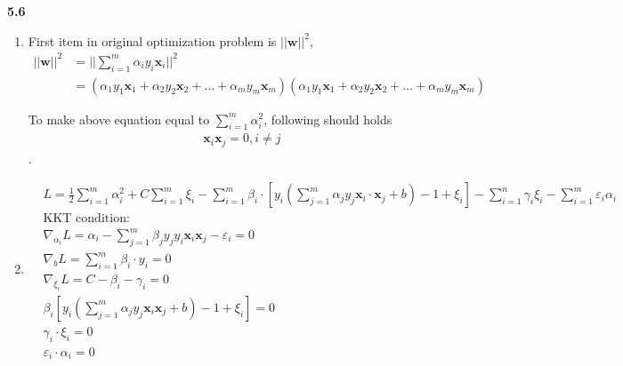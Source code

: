 \documentclass[12pt]{article}
\begin{document}
\vspace{1em}  %

\noindent \textbf{5.6}

\begin{enumerate}[label=(\alph*), left=0pt]
    \item First item in original optimization problem is $||\mathbf{w}||^{2}$, 
        \begin{align*}
            ||\mathbf{w}||^{2} &= ||\sum_{i=1}^{m}\alpha_{i}y_{i}\mathbf{x}_{i}||^{2} \\
            &= (\alpha_{1}y_{1}\mathbf{x}_{1}+\alpha_{2}y_{2}\mathbf{x}_{2}+\dots+\alpha_{m}y_{m}\mathbf{x}_{m})(\alpha_{1}y_{1}\mathbf{x}_{1}+\alpha_{2}y_{2}\mathbf{x}_{2}+\dots+\alpha_{m}y_{m}\mathbf{x}_{m})
        \end{align*}
        
        To make above equation equal to $\sum_{i=1}^{m}\alpha_{i}^{2}$, following should holds 
        \begin{align*}
            \mathbf{x}_{i}\mathbf{x}_{j} = 0, i \ne j
        \end{align*}.

    \item 
    \begin{align*}
        &L=\frac{1}{2}\sum_{i=1}^{m}\alpha_{i}^{2}+C\sum_{i=1}^{m}\xi_{i}-\sum_{i=1}^{m}\beta_{i}\cdot[y_{i}(\sum_{j=1}^{m}\alpha_{j}y_{j}\textbf{x}_{i}\cdot \textbf{x}_{j}+b)-1+\xi_{i}]-\sum_{i=1}^{n}\gamma_{i}\xi_{i}-\sum_{i=1}^{m}\varepsilon_{i}\alpha_{i} \\
        &\text{KKT condition:} \\
        & \nabla_{\alpha_{i}}L=\alpha_{i} - \sum_{j=1}^{m}\beta_{j}y_{j}y_{i}\textbf{x}_{i}\textbf{x}_{j}-\varepsilon_{i}=0 \\
        &\nabla_{b}L=\sum_{i=1}^{m}\beta_{i}\cdot y_{i}=0 \\
        &\nabla_{\xi_{i}}L=C-\beta_{i}-\gamma_{i}=0 \\
        &\beta_{i}[y_{i}(\sum_{j=1}^{m}\alpha_{j}y_{j}\textbf{x}_{i}\textbf{x}_{j}+b)-1+\xi_{i}]=0 \\
        &\gamma_{i}\cdot\xi_{i}=0 \\
        &\varepsilon_{i}\cdot\alpha_{i}=0
    \end{align*}


\end{enumerate}
\end{document}
